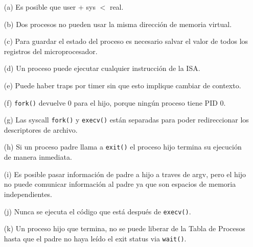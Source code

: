 \documentclass[12pt]{article}
\begin{document}
\begin{itemize}
    \item[(a)] Es posible que user + sys $<$ real.
    \item[(b)] Dos procesos no pueden usar la misma dirección de memoria virtual.
    \item[(c)] Para guardar el estado del proceso es necesario salvar el valor de todos los registros del microprocesador.
    \item[(d)] Un proceso puede ejecutar cualquier instrucción de la ISA.
    \item[(e)] Puede haber traps por timer sin que esto implique cambiar de contexto.
    \item[(f)] \texttt{fork()} devuelve 0 para el hijo, porque ningún proceso tiene PID 0.
    \item[(g)] Las syscall \texttt{fork()} y \texttt{execv()} están separadas para poder redireccionar los descriptores de archivo.
    \item[(h)] Si un proceso padre llama a \texttt{exit()} el proceso hijo termina su ejecución de manera inmediata.
    \item[(i)] Es posible pasar información de padre a hijo a traves de argv, pero el hijo no puede comunicar información al padre ya que son espacios de memoria independientes.
    \item[(j)] Nunca se ejecuta el código que está después de \texttt{execv()}.
    \item[(k)] Un proceso hijo que termina, no se puede liberar de la Tabla de Procesos hasta que el padre no haya leído el exit status via \texttt{wait()}.
\end{itemize}
\end{document}
